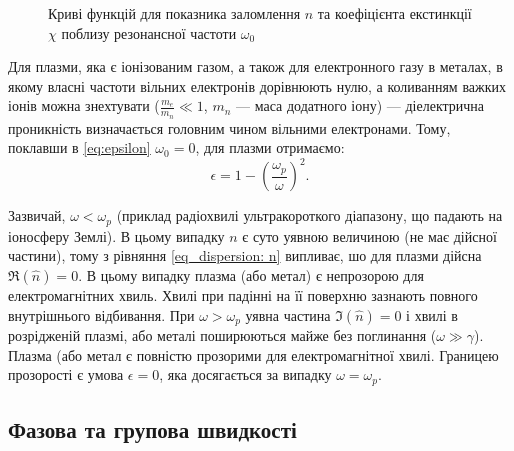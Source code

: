 \begin{figure}[h!]\centering
	
	\caption{Криві функцій для показника заломлення $n$ та коефіцієнта екстинкції $\chi$ поблизу резонансної частоти $\omega_0$}
	\label{plt:n,a(omega)}
\end{figure}

Для плазми, яка є іонізованим газом, а також для електронного газу в металах, в якому власні частоти вільних електронів дорівнюють нулю, а коливанням
важких іонів можна знехтувати ($\frac{m_e}{m_n} \ll 1$, $m_n$ --- маса додатного іону) ---
діелектрична проникність визначається головним чином
вільними електронами. Тому, поклавши в \eqref{eq:epsilon} $\omega_0 = 0$, для плазми отримаємо:
\begin{equation}\label{eq:plasm}
	\epsilon = 1 - \left( \frac{\omega_p}{\omega}\right)^2.
\end{equation}

Зазвичай, $\omega < \omega_p$ (приклад радіохвилі ультракороткого діапазону, що падають на іоносферу Землі). В цьому випадку $n$ є суто уявною
величиною (не має дійсної частини), тому з рівняння \eqref{eq_dispersion: n} випливає, шо для плазми дійсна $\Re{(\hat{n})} = 0$. В цьому випадку
плазма (або метал) є непрозорою для електромагнітних хвиль. Хвилі при падінні на її поверхню зазнають повного внутрішнього відбивання. При $\omega >
\omega_p$ уявна частина $\Im{(\hat{n})} = 0$ і хвилі в розрідженій плазмі, або металі поширюються майже без поглинання ($\omega \gg \gamma$). Плазма
(або метал є повністю прозорими для електромагнітної хвилі. Границею прозорості є умова $\epsilon = 0$, яка досягається за випадку $\omega =
\omega_p$.





\subsection{Фазова та групова швидкості}



